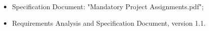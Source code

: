 \begin{itemize}
\item Specification Document: "Mandatory Project Assignments.pdf";
\item Requirements Analysis and Specification Document, version 1.1.
\end{itemize}